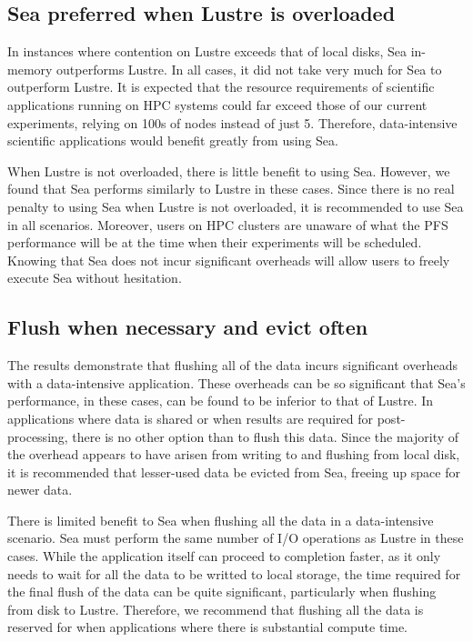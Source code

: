     \subsection{Sea preferred when Lustre is overloaded}

    In instances where contention on Lustre exceeds that of local disks, Sea in-memory 
    outperforms Lustre. In all cases, it did not take very much for Sea to outperform
    Lustre. It is expected that the resource requirements of scientific applications 
    running on HPC systems could far exceed those of our current experiments, relying on
    100s of nodes instead of just 5. Therefore, data-intensive scientific applications
    would benefit greatly from using Sea.

    When Lustre is not overloaded, there is little benefit to using Sea. However, we found
    that Sea performs similarly to Lustre in these cases. Since there is no real penalty to 
    using Sea when Lustre is not overloaded, it is recommended to use Sea in all scenarios.
    Moreover, users on HPC clusters are unaware of what the PFS performance will be at the 
    time when their experiments will be scheduled. Knowing that Sea does not incur significant
    overheads will allow users to freely execute Sea without hesitation. 

    \subsection{Flush when necessary and evict often}

    The results demonstrate that flushing all of the data incurs significant
    overheads with a data-intensive application. These overheads can be so
    significant that Sea's performance, in these cases, can be found to be
    inferior to that of Lustre. In applications where data is shared or when
    results are required for post-processing, there is no other option than to
    flush this data. Since the majority of the overhead appears to have arisen
    from writing to and flushing from local disk, it is recommended that
    lesser-used data be evicted from Sea, freeing up space for newer data.

    There is limited benefit to Sea when flushing all the data in a
    data-intensive scenario. Sea must perform the same number of I/O operations
    as Lustre in these cases. While the application itself can proceed to
    completion faster, as it only needs to wait for all the data to be writted
    to local storage, the time required for the final flush of the data can be
    quite significant, particularly when flushing from disk to Lustre. Therefore,
    we recommend that flushing all the data is reserved for when applications where
    there is substantial compute time. 


